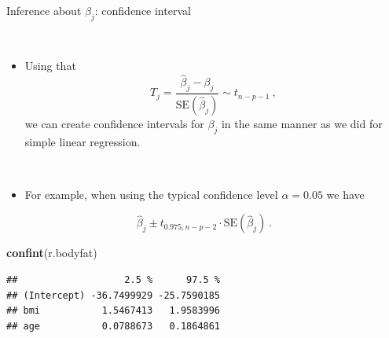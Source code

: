 \documentclass[10pt,ignorenonframetext,]{beamer}
\newenvironment{Shaded}{\begin{snugshade}}{\end{snugshade}}
\newcommand{\KeywordTok}[1]{\textcolor[rgb]{0.13,0.29,0.53}{\textbf{#1}}}
\newcommand{\NormalTok}[1]{#1}
\providecommand{\tightlist}{%
  \setlength{\itemsep}{0pt}\setlength{\parskip}{0pt}}
\begin{document}
\begin{frame}

\begin{block}{Inference about \(\beta_j\): confidence interval}

\(~\)

\begin{itemize}
\tightlist
\item
  Using that
  \[ T_j=\frac{\hat{\beta}_j-\beta_j}{\text{SE}(\hat\beta_j)}\sim t_{n-p-1} \ ,\]
  we can create confidence intervals for \(\beta_j\) in the same manner
  as we did for simple linear regression.
\end{itemize}

\(~\)

\begin{itemize}
\tightlist
\item
  For example, when using the typical confidence level \(\alpha=0.05\)
  we have
\end{itemize}

\[\hat{\beta}_j \pm t_{0.975,n-p-2} \cdot\text{SE} (\hat{\beta}_j)  \ .\]

\end{block}

\end{frame}

\begin{frame}[fragile]

\footnotesize

\begin{Shaded}
\begin{Highlighting}[]
\KeywordTok{confint}\NormalTok{(r.bodyfat)}
\end{Highlighting}
\end{Shaded}

\begin{verbatim}
##                   2.5 %      97.5 %
## (Intercept) -36.7499929 -25.7590185
## bmi           1.5467413   1.9583996
## age           0.0788673   0.1864861
\end{verbatim}

\normalsize

\end{frame}
\end{document}
